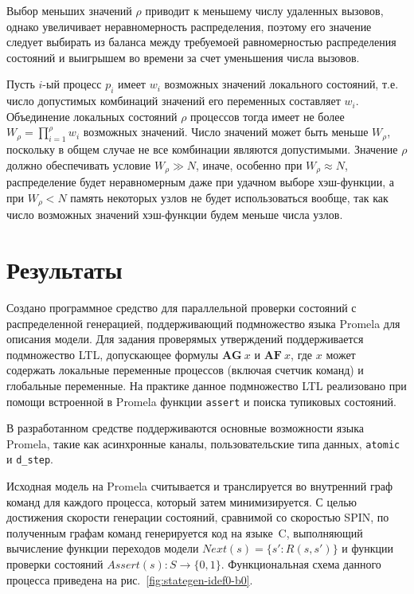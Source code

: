\documentclass[12pt,a4paper,fleqn]{article}
\begin{document}
Выбор меньших значений $\rho$ приводит к меньшему числу удаленных вызовов, однако увеличивает неравномерность
распределения, поэтому его значение следует выбирать из баланса между требуемоей равномерностью распределения состояний
и выигрышем во времени за счет уменьшения числа вызовов.

Пусть $i$-ый процесс $p_i$ имеет $w_i$ возможных значений локального состояний, т.е. число допустимых комбинаций
значений его переменных составляет $w_i$. Объединение локальных состояний $\rho$ процессов тогда имеет не более $W_\rho
= \prod_{i=1}^{\rho}{w_i}$ возможных значений. Число значений может быть меньше $W_\rho$, поскольку в общем случае не
все комбинации являются допустимыми. Значение $\rho$ должно обеспечивать условие $W_\rho \gg N$, иначе, особенно при
$W_\rho \approx N$, распределение будет неравномерным даже при удачном выборе хэш-функции, а при $W_\rho < N$ память
некоторых узлов не будет использоваться вообще, так как число возможных значений хэш-функции будем меньше числа узлов.

\section{Результаты}
\label{sec:experim}

Создано программное средство для параллельной проверки состояний с распределенной генерацией, поддерживающий
подмножество языка Promela для описания модели. Для задания проверямых утверждений поддерживается подмножество LTL,
допускающее формулы $\mathbf{AG}~x$ и $\mathbf{AF}~x$, где $x$ может содержать локальные переменные процессов (включая
счетчик команд) и глобальные переменные. На практике данное подмножество LTL реализовано при помощи встроенной в Promela
функции \texttt{assert} и поиска тупиковых состояний.

В разработанном средстве поддерживаются основные возможности языка Promela, такие как асинхронные каналы,
пользовательские типа данных, \texttt{atomic} и \texttt{d\_step}.~\cite{SpinRoot}

Исходная модель на Promela считывается и транслируется во внутренний граф команд для каждого процесса, который затем
минимизируется. С целью достижения скорости генерации состояний, сравнимой со скоростью SPIN, по полученным графам
команд генерируется код на языке~C, выполняющий вычисление функции переходов модели $Next(s) = \{s': R(s, s')\}$ и
функции проверки состояний $Assert(s): S \rightarrow \{0, 1\}$. Функциональная схема данного процесса приведена на
рис.~\ref{fig:stategen-idef0-b0}.
\end{document}
